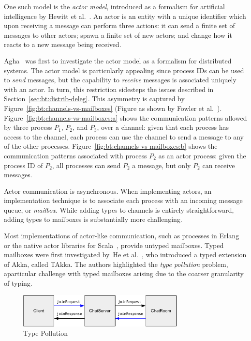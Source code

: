 \documentclass[
graybox,
envcountchap
]{svmult}
\begin{document}
\begin{bibunit}
  One such model is the \emph{actor model}, introduced as a formalism for artificial
  intelligence by Hewitt et al.~\cite{HewittBS73:actors}. An actor is an entity with a
  unique identifier which upon receiving a message can perform
  three actions: it can send a finite set of messages to other actors; spawn a
  finite set of new actors; and change how it reacts to a new message being
  received.

  

  Agha~\cite{Agha90:actors} was first to investigate the actor model as a formalism
  for distributed systems. The actor model is particularly appealing since
  process IDs can be used to \emph{send} messages, but the capability to
  \emph{receive} messages is associated uniquely with an actor. In turn, this
  restriction sidesteps the issues described in
  Section~\ref{sec:bt:distrib-deleg}.
  This asymmetry is captured by Figure~\ref{fig:bt:channels-vs-mailboxes} (Figure
  as shown by Fowler et al.~\cite{FowlerLW17:mm}). Figure~\ref{fig:bt:channels-vs-mailboxes:a}
  shows the communication patterns allowed by three process $P_1$, $P_2$, and
  $P_3$, over a channel: given that each process has access to the channel,
  each process can use the channel to send a message to any of the other
  processes. Figure~\ref{fig:bt:channels-vs-mailboxes:b} shows the communication
  patterns associated with process $P_2$ as an actor process: given the process
  ID of $P_2$, all processes can send $P_2$ a message, but only $P_2$ can
  receive messages.

  Actor communication is asynchronous. When implementing actors, an
  implementation technique is to associate each process with an incoming message
  queue, or \emph{mailbox}. While adding types to channels is entirely
  straightforward, adding types to mailboxes is substantially more challenging.

  Most implementations of actor-like communication, such as processes in
  Erlang~\cite{Armstrong10:erlang} or the native actor libraries for
  Scala~\cite{HallerO09:actors}, provide untyped mailboxes.
  Typed mailboxes were first investigated by~He et al.~\cite{HeWT14:actors}, who
  introduced a typed extension of Akka, called TAkka. The authors highlighted
  the \emph{type pollution} problem, aparticular challenge with typed mailboxes
  arising due to the coarser granularity of typing.

  \begin{figure}[t]
    \centering
    \includegraphics[width=0.75\textwidth]{img/type-pollution-example.pdf}
    \caption{Type Pollution}
    \label{fig:bt:type-pollution}
  \end{figure}


\end{bibunit}
\end{document}
